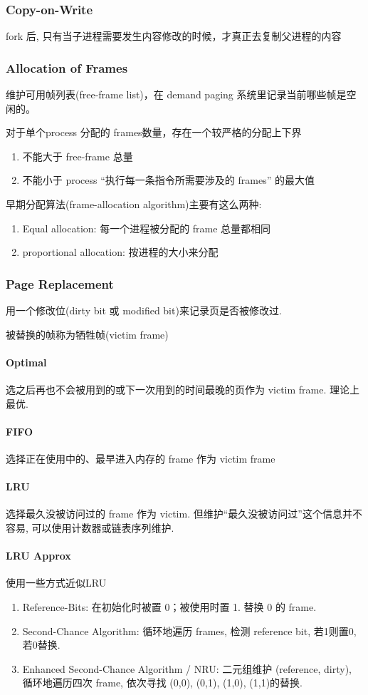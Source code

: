 \subsubsection{Copy-on-Write}
fork 后, 只有当子进程需要发生内容修改的时候，才真正去复制父进程的内容

\subsubsection{Allocation of Frames}
维护可用帧列表(free-frame list)，在 demand paging 系统里记录当前哪些帧是空闲的。

对于单个process 分配的 frames数量，存在一个较严格的分配上下界
\begin{enumerate}
    \item 不能大于 free-frame 总量
    \item 不能小于 process ``执行每一条指令所需要涉及的 frames'' 的最大值
\end{enumerate}

早期分配算法(frame-allocation algorithm)主要有这么两种:
\begin{enumerate}
    \item Equal allocation: 每一个进程被分配的 frame 总量都相同
    \item proportional allocation: 按进程的大小来分配
\end{enumerate}

\subsubsection{Page Replacement}
用一个修改位(dirty bit 或 modified bit)来记录页是否被修改过. 

被替换的帧称为牺牲帧(victim frame)

\paragraph{Optimal}选之后再也不会被用到的或下一次用到的时间最晚的页作为 victim frame. 理论上最优. 
\paragraph{FIFO}选择正在使用中的、最早进入内存的 frame 作为 victim frame
\paragraph{LRU}选择最久没被访问过的 frame 作为 victim. 但维护``最久没被访问过''这个信息并不容易, 可以使用计数器或链表序列维护. 
\paragraph{LRU Approx}使用一些方式近似LRU
\begin{enumerate}
    \item Reference-Bits: 在初始化时被置 0；被使用时置 1. 替换 0 的 frame. 
    \item Second-Chance Algorithm: 循环地遍历 frames, 检测 reference bit, 若1则置0, 若0替换. 
    \item Enhanced Second-Chance Algorithm / NRU: 二元组维护 (reference, dirty), 循环地遍历四次 frame, 依次寻找 (0,0), (0,1), (1,0), (1,1)的替换. 
\end{enumerate}

